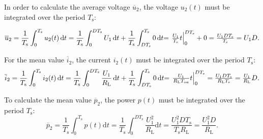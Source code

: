\begin{solutionblock} 
In order to calculate the average voltage $\overline u_2$, the voltage $u_{\mathrm{2}}(t)$ must be integrated over the period $T_{\mathrm{s}}$:

\begin{equation}
    \overline u_2 = \frac{1}{T_{\mathrm{s}}} \int_0^{ T_{\mathrm{s}}} u_2 (t) \, \mathrm{d}t = \frac{1}{ T_{\mathrm{s}}} \int_0^{D T_{\mathrm{s}}} U_1 \, \mathrm{d}t + \frac{1}{ T_{\mathrm{s}}} \int_{D  T_{\mathrm{s}}}^{ T_{\mathrm{s}}} 0 \, \mathrm{d}t$$
    $$= \left . \frac{U_1}{ T_{\mathrm{s}}} t \right |_0^{D  T_{\mathrm{s}}}  + 0 = \frac{U_1 D  T_{\mathrm{s}}}{ T_{\mathrm{s}}} = U_1 D.
\end{equation}

For the mean value $\overline i_2$, the current $i_{\mathrm{2}}(t)$ must be integrated over the period $T_{\mathrm{s}}$:
\begin{equation}
    \overline i_2 = \frac{1}{ T_{\mathrm{s}}} \int_0^{ T_{\mathrm{s}}} i_2(t) \, \mathrm{d}t = \frac{1}{ T_{\mathrm{s}}}\int_0^{D  T_{\mathrm{s}}} \frac{U_1}{ R_{\mathrm{L}}} \, \mathrm{d}t + \frac{1}{ T_{\mathrm{s}}}\int_{D  T_{\mathrm{s}}}^{ T_{\mathrm{s}}} 0 \, \mathrm{d}t$$
    $$= \left . \frac{U_1}{ R_{\mathrm{L}}  T_{\mathrm{on}}}  t \right |_0^{D  T_{\mathrm{s}}} = \frac{U_1 D  T_{\mathrm{s}}}{ R_{\mathrm{L}}  T_{\mathrm{s}}} = \frac{U_1}{ R_{\mathrm{L}}} D.
\end{equation}

To calculate the mean value $\overline{p}_{\mathrm{2}}$, the power $p(t)$ must be integrated over the period $T_{\mathrm{s}}$:
\begin{equation}
    \overline{p}_{\mathrm{2}} = \frac{1}{T_{\mathrm{s}}} \int_0^{T_{\mathrm{s}}} p(t) \mathrm{d}t = \frac{1}{T_{\mathrm{s}}} \int_0^{D T_{\mathrm{s}}} \frac{U_1^2}{ R_{\mathrm{L}}} \mathrm{d}t = \frac{U_1^2 D T_{\mathrm{s}}}{ T_{\mathrm{s}}  R_{\mathrm{L}}} = \frac{U_1^2 D}{ R_{\mathrm{L}}}.
\end{equation}
\end{solutionblock}



